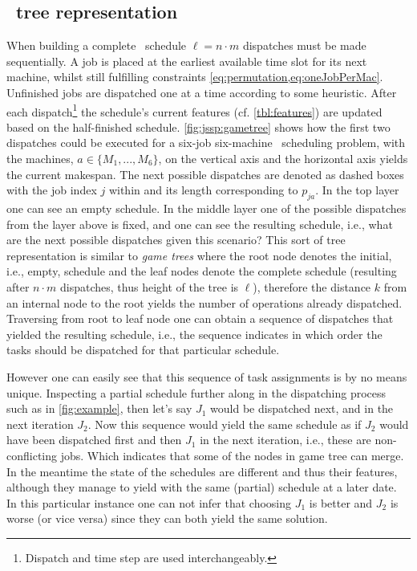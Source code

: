 \subsection{\JSP\ tree representation}\label{sec:gen:gametree}
When building a complete \JSP\ schedule $\ell=n\cdot m$ dispatches must be made sequentially. 
A job is placed at the earliest available time slot for its next machine, whilst still fulfilling constraints \cref{eq:permutation,eq:oneJobPerMac}.
Unfinished jobs are dispatched one at a time according to some heuristic. After each dispatch\footnote{Dispatch and time step are used interchangeably.} the schedule's current features (cf. \cref{tbl:features}) are updated based on the half-finished schedule. \cref{fig:jssp:gametree} shows how the first two dispatches could be executed for a six-job six-machine \jsp\ scheduling problem, with the machines, $a\in\{M_1,...,M_6\}$, on the vertical axis and the horizontal axis yields the current makespan. The next possible dispatches are denoted as dashed boxes with the job index $j$ within and its length corresponding to $p_{ja}$.
In the top layer one can see an empty schedule.
In the middle layer one of the possible dispatches from the layer above is fixed, and one can see the resulting schedule, i.e., what are the next possible dispatches given this scenario? This sort of tree representation is similar to \emph{game trees} \citep[cf.][]{Rosen03} where the root node denotes the initial, i.e., empty, schedule and the leaf nodes denote the complete schedule (resulting after $n\cdot m$ dispatches, thus height of the tree is $\ell$), therefore the distance $k$ from an internal node to the root yields the number of operations already dispatched. Traversing from root to leaf node one can obtain a sequence of dispatches that yielded the resulting schedule, i.e., the sequence indicates in which order the tasks should be dispatched for that particular schedule. 

However one can easily see that this sequence of task assignments is by no means unique. Inspecting a partial schedule further along in the dispatching process such as in \cref{fig:example}, then let's say $J_1$ would be dispatched next, and in the next iteration $J_2$. Now this sequence would yield the same schedule as if $J_2$ would have been dispatched first and then $J_1$ in the next iteration, i.e., these are non-conflicting jobs. Which indicates that some of the nodes in game tree can merge. In the meantime the state of the schedules are different and thus their features, although they manage to yield with the same (partial) schedule at a later date.  %
In this particular instance one can not infer that choosing $J_1$ is better and $J_2$ is worse (or vice versa) since they can both yield the same solution.

